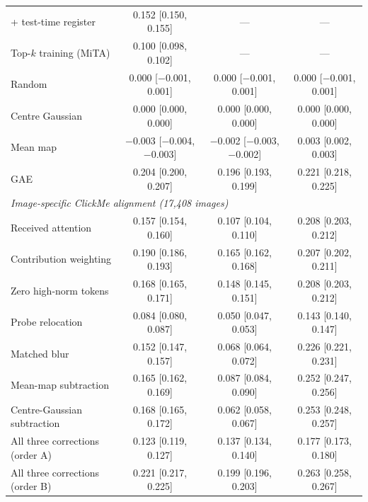\begin{tabular}{lccc}
+ test-time register & 0.152 {\scriptsize [0.150, 0.155]} & --- & --- \\
Top-$k$ training (MiTA) & 0.100 {\scriptsize [0.098, 0.102]} & --- & --- \\
\addlinespace[2pt]
Random & 0.000 {\scriptsize [$-$0.001, 0.001]} & 0.000 {\scriptsize [$-$0.001, 0.001]} & 0.000 {\scriptsize [$-$0.001, 0.001]} \\
Centre Gaussian & 0.000 {\scriptsize [0.000, 0.000]} & 0.000 {\scriptsize [0.000, 0.000]} & 0.000 {\scriptsize [0.000, 0.000]} \\
Mean map & $-$0.003 {\scriptsize [$-$0.004, $-$0.003]} & $-$0.002 {\scriptsize [$-$0.003, $-$0.002]} & 0.003 {\scriptsize [0.002, 0.003]} \\
GAE & 0.204 {\scriptsize [0.200, 0.207]} & 0.196 {\scriptsize [0.193, 0.199]} & 0.221 {\scriptsize [0.218, 0.225]} \\
\midrule
\multicolumn{4}{l}{\emph{Image-specific ClickMe alignment (17,408 images)}} \\
\addlinespace[1pt]
Received attention & 0.157 {\scriptsize [0.154, 0.160]} & 0.107 {\scriptsize [0.104, 0.110]} & 0.208 {\scriptsize [0.203, 0.212]} \\
Contribution weighting & 0.190 {\scriptsize [0.186, 0.193]} & 0.165 {\scriptsize [0.162, 0.168]} & 0.207 {\scriptsize [0.202, 0.211]} \\
\quad Zero high-norm tokens & 0.168 {\scriptsize [0.165, 0.171]} & 0.148 {\scriptsize [0.145, 0.151]} & 0.208 {\scriptsize [0.203, 0.212]} \\
Probe relocation & 0.084 {\scriptsize [0.080, 0.087]} & 0.050 {\scriptsize [0.047, 0.053]} & 0.143 {\scriptsize [0.140, 0.147]} \\
\quad Matched blur & 0.152 {\scriptsize [0.147, 0.157]} & 0.068 {\scriptsize [0.064, 0.072]} & 0.226 {\scriptsize [0.221, 0.231]} \\
Mean-map subtraction & 0.165 {\scriptsize [0.162, 0.169]} & 0.087 {\scriptsize [0.084, 0.090]} & 0.252 {\scriptsize [0.247, 0.256]} \\
\quad Centre-Gaussian subtraction & 0.168 {\scriptsize [0.165, 0.172]} & 0.062 {\scriptsize [0.058, 0.067]} & 0.253 {\scriptsize [0.248, 0.257]} \\
All three corrections (order A) & 0.123 {\scriptsize [0.119, 0.127]} & 0.137 {\scriptsize [0.134, 0.140]} & 0.177 {\scriptsize [0.173, 0.180]} \\
All three corrections (order B) & 0.221 {\scriptsize [0.217, 0.225]} & 0.199 {\scriptsize [0.196, 0.203]} & 0.263 {\scriptsize [0.258, 0.267]} \\

\end{tabular}
